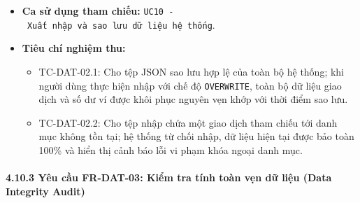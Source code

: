 \documentclass[11pt,a4paper]{article}
\providecommand{\tightlist}{
  \setlength{\itemsep}{0pt}\setlength{\parskip}{0pt}}
\begin{document}
\begin{itemize}
  \begin{itemize}
  \tightlist
  \item
    Dữ liệu hệ thống được phục hồi thành công.
  \item
    Báo cáo kết quả nhập gồm: Tổng số bản ghi xử lý, số bản ghi thêm
    mới, số bản ghi cập nhật.
  \item
    Thông báo hoàn tất quá trình phục hồi dữ liệu.
  \end{itemize}
\item
  \textbf{Ca sử dụng tham chiếu:}
  \texttt{UC10\ -\ Xuất\ nhập\ và\ sao\ lưu\ dữ\ liệu\ hệ\ thống}.
\item
  \textbf{Tiêu chí nghiệm thu:}

  \begin{itemize}
  \tightlist
  \item
    TC-DAT-02.1: Cho tệp JSON sao lưu hợp lệ của toàn bộ hệ thống; khi
    người dùng thực hiện nhập với chế độ \texttt{OVERWRITE}, toàn bộ dữ
    liệu giao dịch và số dư ví được khôi phục nguyên vẹn khớp với thời
    điểm sao lưu.
  \item
    TC-DAT-02.2: Cho tệp nhập chứa một giao dịch tham chiếu tới danh mục
    không tồn tại; hệ thống từ chối nhập, dữ liệu hiện tại được bảo toàn
    100\% và hiển thị cảnh báo lỗi vi phạm khóa ngoại danh mục.
  \end{itemize}
\end{itemize}

\paragraph{4.10.3 Yêu cầu FR-DAT-03: Kiểm tra tính toàn vẹn dữ liệu
(Data Integrity
Audit)}\label{4103-yuxeau-cux1ea7u-fr-dat-03-kiux1ec3m-tra-tuxednh-touxe0n-vux1eb9n-dux1eef-liux1ec7u-data-integrity-audit}
\end{document}
